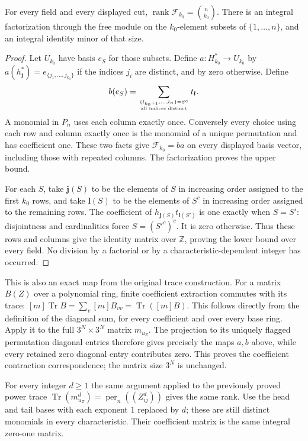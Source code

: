 \begin{theorem}\label{thm:per-exact-row-rank}
For every field and every displayed cut,
$\operatorname{rank}\mathcal F_{k_0}=\binom n{k_0}$.
There is an integral factorization through the free module on the
$k_0$-element subsets of $\{1,\ldots,n\}$, and an integral identity
minor of that size.
\end{theorem}
\begin{proof}
Let $U_{k_0}$ have basis $e_S$ for those subsets. Define
$a:H_{k_0}^*\to U_{k_0}$ by
$a(h_{\boldsymbol j}^*)=e_{\{j_1,\ldots,j_{k_0}\}}$ if the
indices $j_i$ are distinct, and by zero otherwise. Define
\[
 b(e_S)=\sum_{\{l_{k_0+1},\ldots,l_n\}=S^c
                   \atop\text{all indices distinct}}t_{\boldsymbol l}.
\]
A monomial in $P_n$ uses each column exactly once. Conversely every
choice using each row and column exactly once is the monomial of a
unique permutation and has coefficient one. These two facts give
$\mathcal F_{k_0}=ba$ on every displayed basis vector, including
those with repeated columns. The factorization proves the upper bound.

For each $S$, take $\boldsymbol j(S)$ to be the elements of $S$ in
increasing order assigned to the first $k_0$ rows, and take
$\boldsymbol l(S)$ to be the elements of $S^c$ in increasing order
assigned to the remaining rows. The coefficient of
$h_{\boldsymbol j(S)}t_{\boldsymbol l(S')}$ is one exactly when
$S=S'$: disjointness and cardinalities force $S=(S'^c)^c$.
It is zero otherwise. Thus these rows and columns give the identity
matrix over $\mathbb Z$, proving the lower bound over every field.
No division by a factorial or by a characteristic-dependent integer
has occurred.
\end{proof}

This is also an exact map from the original trace construction.
For a matrix $B(Z)$ over a polynomial ring, finite coefficient extraction
commutes with its trace:
$[m]\operatorname{Tr}B=\sum_v[m]B_{vv}
=\operatorname{Tr}([m]B)$. This follows directly from the definition
of the diagonal sum, for every coefficient and over every base ring.
Apply it to the full $3^N\times3^N$ matrix $m_{u_Z}$.
The projection to its uniquely flagged permutation diagonal entries
therefore gives precisely the maps $a,b$ above, while every retained
zero diagonal entry contributes zero. This proves the coefficient
contraction correspondence; the matrix size $3^N$ is unchanged.

For every integer $d\ge1$ the same argument applied to the previously
proved power trace $\operatorname{Tr}(m_{u_Z}^d)
=\operatorname{per}_n((Z_{ij}^d))$ gives the same rank.
Use the head and tail bases with each exponent $1$ replaced by $d$;
these are still distinct monomials in every characteristic. Their
coefficient matrix is the same integral zero-one matrix.

